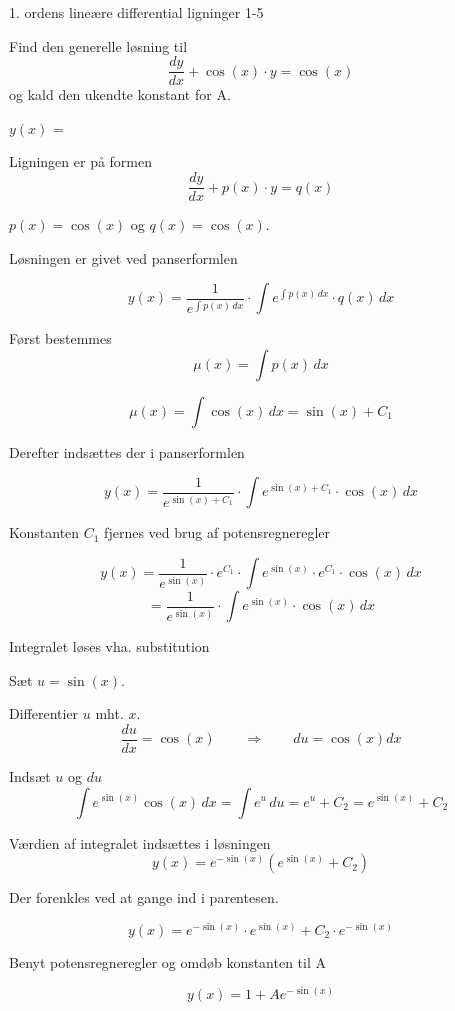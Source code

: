 \documentclass{article}
\begin{document}
\newpage

\begin{exercise}{1. ordens lineære differential ligninger 1-5}





Find den generelle løsning til
\[
\frac{dy}{dx} + \cos(x) \cdot y = \cos(x)
\]
og kald den ukendte konstant for A.

$y(x)$ = 



\hint

Ligningen er på formen
\[
\frac{dy}{dx} + p(x) \cdot y = q(x)
\]

\hint

$p(x)=\cos(x)$ og $q(x)=\cos(x)$.

\hint

Løsningen er givet ved panserformlen


\hint

\[
y(x) = \frac{1}{e^{\int p(x) \, dx}} \cdot \int e^{\int p(x) \, dx} \cdot q(x) \, dx
\]

\hint

Først bestemmes
\[
\mu(x) = \int p(x) \, dx
\]

\hint
\[
\mu(x) = \int \cos(x) \, dx = \sin(x) + C_1
\]

\hint
Derefter indsættes der i panserformlen

\hint

\[
y(x) = \frac{1}{e^{\sin(x) + C_1}} \cdot \int e^{\sin(x) + C_1} \cdot \cos(x) \, dx
\]


\hint

Konstanten $C_1$ fjernes ved brug af potensregneregler

\hint
\[
y(x) = \frac{1}{e^{\sin(x)}} \cdot e^{C_1} \cdot \int e^{\sin(x)} \cdot e^{C_1} \cdot \cos(x) \, dx
\]
\[
= \frac{1}{e^{\sin(x)}} \cdot \int e^{\sin(x)} \cdot \cos(x) \, dx
\]

\hint

Integralet løses vha. substitution


\hint
Sæt $u = \sin(x)$.

\hint

Differentier $u$ mht. $x$.
\[
\frac{du}{dx} = \cos(x) \qquad\Rightarrow \qquad du = \cos(x) dx
\]

\hint
Indsæt $u$ og $du$
\[
\int e^{\sin(x)} \cos(x) \, dx = \int e^{u} \, du = e^{u} + C_2 = e^{\sin(x)} + C_2
\]

\hint

Værdien af integralet indsættes i løsningen
\[
y(x) = e^{- \sin(x)} \left( e^{\sin(x)}+ C_2\right)
\]

\hint

Der forenkles ved at gange ind i parentesen.

\hint
\[
y(x) = e^{- \sin(x)} \cdot e^{\sin(x)} + C_2 \cdot e^{- \sin(x)}
\]

\hint

Benyt potensregneregler og omdøb konstanten til A

\hint
\[
y(x) = 1 + A e^{ - \sin(x)}
\]


\end{exercise}
\end{document}
